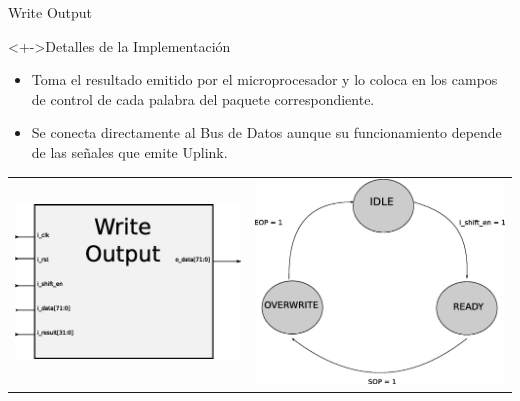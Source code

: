 \documentclass[xcolor=dvipsnames]{beamer}
\begin{document}
\begin{frame}{Write Output}
 \begin{block}<+->{Detalles de la Implementación}
	\begin{itemize}
      \scriptsize
	\item Toma el resultado emitido por el microprocesador y lo coloca en los campos de control de cada palabra del paquete correspondiente.
	\item Se conecta directamente al Bus de Datos aunque su funcionamiento depende de las señales que emite Uplink.
	   \end{itemize}
	   \center 
 \begin{tabularx}{\linewidth}{Z|Z}
    \includegraphics[scale=0.40]{figures/bloqwrite.eps} 
    &
    \includegraphics[scale=0.25]{figures/estwritecompleto.eps}
    \\
  \end{tabularx}
\end{block}
\end{frame}
\end{document}

